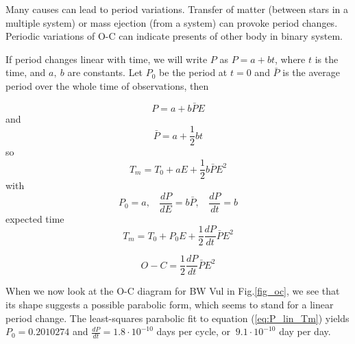 Many causes can lead to period variations.
Transfer of matter (between stars in a multiple system) or mass ejection (from a system)
can provoke period changes. Periodic variations of O-C can indicate presents of other body in binary system.

If period changes linear with time, we will write $P$ as $P = a+bt$, where $t$ is the time, and $a,~b$ are constants.
Let $P_{0}$ be the period at $t=0$ and $\bar{P}$ is the average period over the whole time of observations, then

\begin{equation} \label{eq:P_lin_P}
P = a + b \bar{P}E
\end{equation} 
and
\begin{equation} \label{eq:P_lin_Pmid}
\bar{P} = a + \frac{1}{2}bt
\end{equation}  
so
\begin{equation} \label{eq:P_lin_Tm}
T_{m} = T_{0} + aE + \frac{1}{2}b \bar{P}E^{2}
\end{equation} 
with
\begin{equation} \label{eq:P_lin_add}
P_{0} = a,  ~~~~  \frac{dP}{dE} = b\bar{P},   ~~~~   \frac{dP}{dt} = b
\end{equation} 
expected time
\begin{equation} \label{eq:P_lin_Tm_res}
T_{m} = T_{0} + P_{0}E + \frac{1}{2} \frac{dP}{dt} \bar{P}E^{2}
\end{equation} 

\begin{equation} \label{eq:P_lin_OC_res}
O-C = \frac{1}{2} \frac{dP}{dt} \bar{P}E^{2}
\end{equation} 


When we now look at the O-C diagram for BW Vul in Fig.\ref{fig_oc}, we see that its
shape suggests a possible parabolic form, which seems to stand for a linear period
change. The least-squares parabolic fit to equation (\ref{eq:P_lin_Tm}) yields $P_{0} = 0.2010274$
and $\frac{dP}{dt}= 1.8 \cdot 10^{−10}$ days per cycle, or $~9.1 \cdot 10^{−10}$ day per day.

